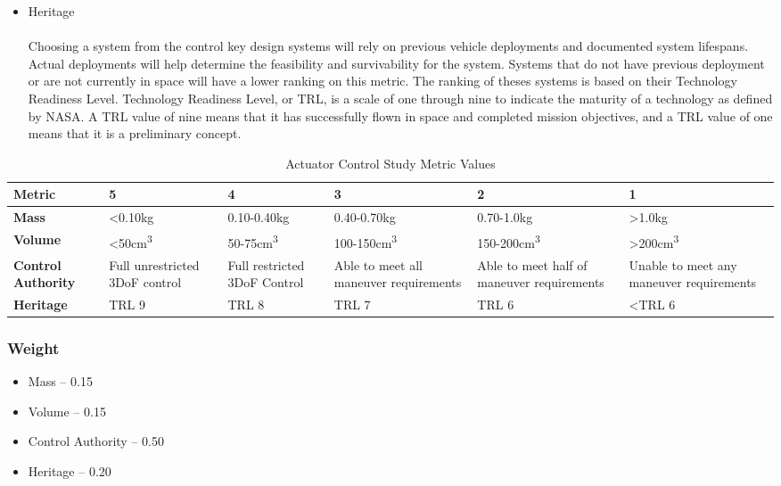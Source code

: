 \begin{itemize}
\item{Heritage} \\ 
\\ 
Choosing a system from the control key design systems will rely on previous vehicle deployments and documented system lifespans. Actual deployments will help determine the feasibility and survivability for the system. Systems that do not have previous deployment or are not currently in space will have a lower ranking on this metric. The ranking of theses systems is based on their Technology Readiness Level. Technology Readiness Level, or TRL, is a scale of one through nine to indicate the maturity of a technology as defined by NASA\cite{TRL}. A TRL value of nine means that it has successfully flown in space and completed mission objectives, and a TRL value of one means that it is a preliminary concept.
\end{itemize}
\begin{table}[H]
\centering
\begin{tabular}{|p{}|p{}|p{}|p{}|p{}|p{}|}
\hline
    \textbf{Metric} & \textbf{5} & \textbf{4} & \textbf{3} & \textbf{2} & \textbf{1}
    \\
\hline
    \textbf{Mass} & <0.10kg & 0.10-0.40kg & 0.40-0.70kg & 0.70-1.0kg & >1.0kg 
    \\   
\hline
    \textbf{Volume} & <50cm\textsuperscript{3} & 50-75cm\textsuperscript{3} & 100-150cm\textsuperscript{3} & 150-200cm\textsuperscript{3} & >200cm\textsuperscript{3} 
    \\    
\hline
    \textbf{Control Authority} & Full unrestricted 3DoF control  & Full restricted 3DoF Control & Able to meet all maneuver requirements & Able to meet half of maneuver requirements & Unable to meet any maneuver requirements  
    \\
\hline
    \textbf{Heritage} & TRL 9 & TRL 8 & TRL 7 & TRL 6 & <TRL 6 
    \\
\hline
\end{tabular}
\caption{Actuator Control Study Metric Values}
\label{tbl:Control_Metric_Scores}
\end{table}
\subsubsection{Weight}
\begin{itemize}
    \item Mass – 0.15
    \item Volume – 0.15
    \item Control Authority – 0.50
    \item Heritage – 0.20
\end{itemize}


